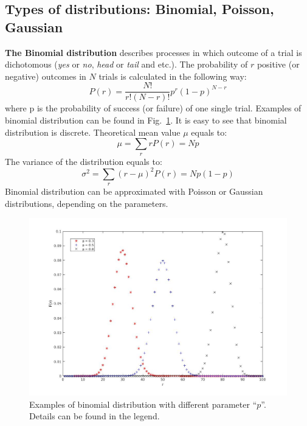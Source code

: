 \documentclass[12pt,a4paper]{report}
\begin{document}
\subsection{Types of distributions: Binomial, Poisson, Gaussian} 
\textbf{The Binomial distribution} describes processes in which outcome of a trial is dichotomous (\textit{yes} or \textit{no}, \textit{head} or \textit{tail} and etc.). The probability of $r$ positive (or negative) outcomes in $N$ trials is calculated in the following way:
\begin{equation} \label{binom_dist}
P(r) = \frac{N!}{r! (N-r)!}p^r (1-p)^{N-r}
\end{equation}
where p is the probability of success (or failure) of one single trial. Examples of binomial distribution can be found in Fig.~\ref{fig:Binom}. It is easy to see that binomial distribution is discrete. Theoretical mean value $\mu$ equals to:
\begin{equation} \label{binom_mean_val}
\mu = \sum_r r P(r) = Np
\end{equation}
The variance of the distribution equals to:
\begin{equation} \label{binom_var}
\sigma^2 = \sum_r (r-\mu)^2P(r) = Np(1-p)
\end{equation}
Binomial distribution can be approximated with Poisson or Gaussian distributions, depending on the parameters. 
\begin{figure}[!h]
\begin{center}
\includegraphics*[scale = 0.5]{Figures/Binom}
\caption{\label{fig:Binom} Examples of binomial distribution with different parameter \enquote{$p$}. Details can be found in the legend.}
\end{center}
\end{figure}
\end{document}
